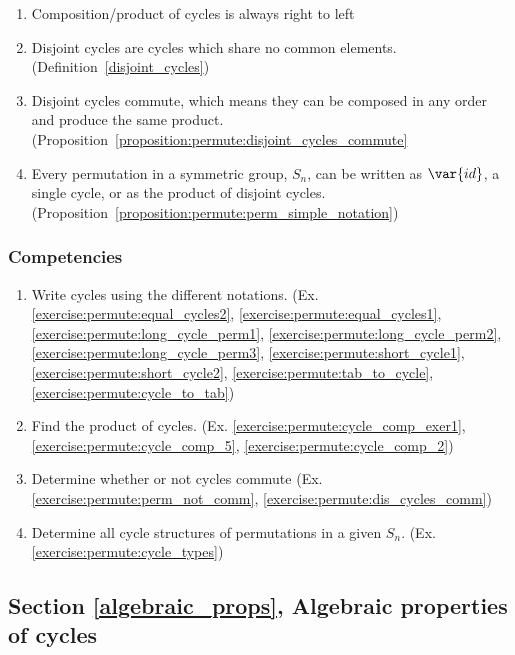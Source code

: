 \begin{enumerate}
\item
Composition/product of cycles is always right to left
\item
Disjoint cycles are cycles which share no common elements.  (Definition~\ref{disjoint_cycles})
\item
Disjoint cycles commute, which means they can be composed in any order and produce the same product. (Proposition~\ref{proposition:permute:disjoint_cycles_commute}
\item
Every permutation in a symmetric group, $S_n$, can be written as $\var{id}$, a single cycle, or as the product of disjoint cycles. (Proposition~\ref{proposition:permute:perm_simple_notation})
\end{enumerate}

\subsubsection*{Competencies}
\begin{enumerate}
\item
Write cycles using the different notations.  (Ex. \ref{exercise:permute:equal_cycles2}, \ref{exercise:permute:equal_cycles1},  \ref{exercise:permute:long_cycle_perm1}, \ref{exercise:permute:long_cycle_perm2}, \ref{exercise:permute:long_cycle_perm3}, \ref{exercise:permute:short_cycle1}, \ref{exercise:permute:short_cycle2}, \ref{exercise:permute:tab_to_cycle}, \ref{exercise:permute:cycle_to_tab})
\item
Find the product of cycles.  (Ex. \ref{exercise:permute:cycle_comp_exer1}, \ref{exercise:permute:cycle_comp_5}, \ref{exercise:permute:cycle_comp_2})
\item
Determine whether or not cycles commute (Ex. \ref{exercise:permute:perm_not_comm}, \ref{exercise:permute:dis_cycles_comm})
\item
Determine all cycle structures of permutations in a given $S_n$. (Ex. \ref{exercise:permute:cycle_types})
\end{enumerate}


\subsection*{Section \ref{algebraic_props}, Algebraic properties of cycles}
